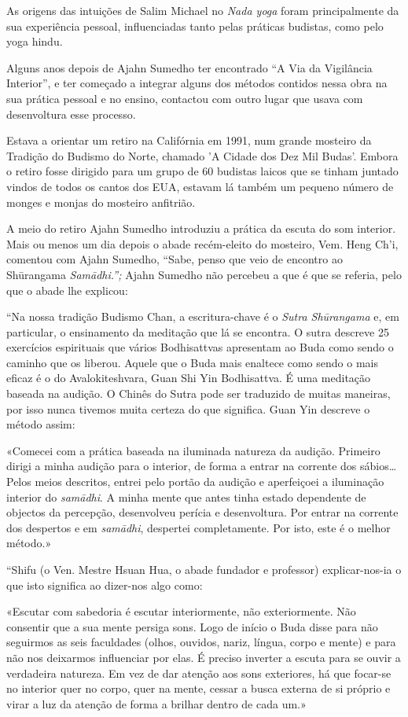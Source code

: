As origens das intuições de Salim Michael no \emph{Nada yoga} foram
principalmente da sua experiência pessoal, influenciadas tanto pelas
práticas budistas, como pelo yoga hindu.

Alguns anos depois de Ajahn Sumedho ter encontrado ``A Via da Vigilância
Interior'', e ter começado a integrar alguns dos métodos contidos nessa
obra na sua prática pessoal e no ensino, contactou com outro lugar que
usava com desenvoltura esse processo.

Estava a orientar um retiro na Califórnia em 1991, num grande mosteiro
da Tradição do Budismo do Norte, chamado 'A Cidade dos Dez Mil Budas'.
Embora o retiro fosse dirigido para um grupo de 60 budistas laicos que
se tinham juntado vindos de todos os cantos dos EUA, estavam lá também
um pequeno número de monges e monjas do mosteiro anfitrião.

A meio do retiro Ajahn Sumedho introduziu a prática da escuta do som
interior. Mais ou menos um dia depois o abade recém-eleito do mosteiro,
Vem. Heng Ch'i, comentou com Ajahn Sumedho, ``Sabe, penso que veio de
encontro ao Shūrangama \emph{Samādhi.'';} Ajahn Sumedho não percebeu a
que é que se referia, pelo que o abade lhe explicou:

``Na nossa tradição Budismo Chan, a escritura-chave é o \emph{Sutra
Shūrangama} e, em particular, o ensinamento da meditação que lá se
encontra. O sutra descreve 25 exercícios espirituais que vários
Bodhisattvas apresentam ao Buda como sendo o caminho que os liberou.
Aquele que o Buda mais enaltece como sendo o mais eficaz é o do
Avalokiteshvara, Guan Shi Yin Bodhisattva. É uma meditação baseada na
audição. O Chinês do Sutra pode ser traduzido de muitas maneiras, por
isso nunca tivemos muita certeza do que significa. Guan Yin descreve o
método assim:

«Comecei com a prática baseada na iluminada natureza da audição.
Primeiro dirigi a minha audição para o interior, de forma a entrar na
corrente dos sábios\ldots{} Pelos meios descritos, entrei pelo portão da
audição e aperfeiçoei a iluminação interior do \emph{samādhi}. A minha
mente que antes tinha estado dependente de objectos da percepção,
desenvolveu perícia e desenvoltura. Por entrar na corrente dos despertos
e em \emph{samādhi}, despertei completamente. Por isto, este é o melhor
método.»\cite{surangama}

``Shifu (o Ven. Mestre Hsuan Hua, o abade fundador e professor)
explicar-nos-ia o que isto significa ao dizer-nos algo como:

«Escutar com sabedoria é escutar interiormente, não exteriormente. Não consentir
que a sua mente persiga sons. Logo de início o Buda disse para não seguirmos as
seis faculdades (olhos, ouvidos, nariz, língua, corpo e mente) e para não nos
deixarmos influenciar por elas. É preciso inverter a escuta para se ouvir a
verdadeira natureza. Em vez de dar atenção aos sons exteriores, há que focar-se
no interior quer no corpo, quer na mente, cessar a busca externa de si próprio e
virar a luz da atenção de forma a brilhar dentro de cada um.»\cite{surangama}

